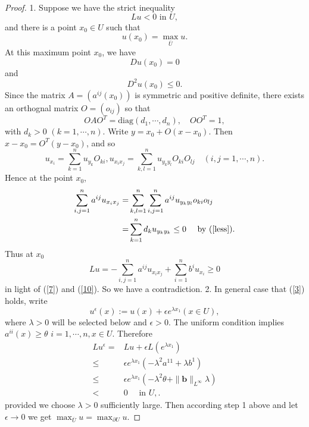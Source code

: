 \begin{proof}
 1. Suppose we have the strict inequality
  \[
  Lu<0 \text{ in }U,
  \] 
and there is a point $x_0\in U$ such that
\begin{equation}
  u(x_0)=\max_{\overline{U}}u.
\end{equation}
At this maximum point $x_0$, we have
\begin{equation}
  Du(x_0)=0\label{7}
\end{equation}
and
\begin{equation}
  D^2u(x_0)\le 0.\label{less}
\end{equation}
Since the matrix $A=\left( a^{ij}(x_0) \right) $ is symmetric and positive definite, there exists
an orthognal matrix $O=\left( o_{ij} \right) $ so that 
\begin{equation}
  OAO^{T}=\text{diag}\left( d_1,\cdots,d_n \right) , \quad O O^{T}=1,
\end{equation}
with $d_k>0$ $\left( k=1,\cdots,n \right) $. Write $y=x_0+O(x-x_0)$. Then $x-x_0=O^{T}(y-x_0)$, and so
\[
  u_{x_i}=\sum_{k=1}^{n} u_{y_k}O_{ki}, u_{x_ix_j}=\sum_{k,l=1}^{n}u_{y_ky_l}O_{ki}O_{lj}\quad \left( i,j=1,\cdots,n \right). 
\] 
Hence at the point $x_0$,
\begin{align}
  \sum_{i,j=1}^{n}a^{ij}u_{x_ix_j}=&\sum_{k,l=1}^{n} \sum_{i,j=1}^{n} a^{ij}u_{y_ky_l}o_{ki}o_{lj}\notag\\
  =& \sum_{k=1}^{n} d_ku_{y_ky_k}\le 0 \quad\text{ by (\ref{less})}\label{10}
.\end{align}
Thus at $x_0$
 \[
Lu=-\sum_{i,j=1}^{n} a^{ij}u_{x_ix_j}+\sum_{i=1}^{n} b^{i}u_{x_i}\ge 0
\] 
in light of (\ref{7}) and (\ref{10}). So we have a contradiction.
2. In general case that (\ref{3}) holds, write
 \[
   u^{\epsilon}(x):=u(x)+\epsilon e^{\lambda x_1} (x\in  U),
\] 
where $\lambda>0$ will be selected below and $\epsilon>0$. The uniform condition implies $a^{ii}(x)\ge \theta$ $i=1,\cdots,n,x\in U$. Therefore
\begin{align*}
  Lu^{\epsilon }=&Lu+\epsilon L\left( e^{\lambda x_1} \right) \\
  \le & \epsilon e^{\lambda x_1}\left( -\lambda^2a^{11}+\lambda b^{1} \right) \\
  \le& \epsilon e^{\lambda x_1}\left( -\lambda^2\theta+\|\mathbf{b}\|_{L^{\infty}}\lambda \right)\\
  <&0\quad \text{ in }U,
.\end{align*}
provided we choose $\lambda>0$ sufficiently large. Then according step 1 above and let $\epsilon \to 0$ we get $\max_{\overline{U}}u=\max_{\partial U}u$.
\end{proof}
